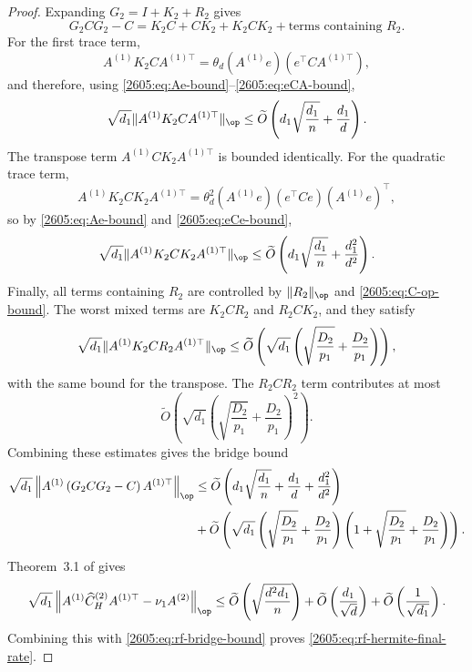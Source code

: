 \begin{proof}
Expanding $G_2=I+K_2+R_2$ gives
\[
    G_2CG_2-C
    =
    K_2C+CK_2+K_2CK_2
    +
    \text{terms containing }R_2.
\]
For the first trace term,
\[
    A^{(1)}K_2CA^{(1)\top}
    =
    \theta_d
    (A^{(1)}e)(e^\top C A^{(1)\top}),
\]
and therefore, using
\eqref{2605:eq:Ae-bound}--\eqref{2605:eq:eCA-bound},
\[
    \sqrt{d_1}
    \|A^{(1)}K_2CA^{(1)\top}\|_{\op}
    \le
    \widetilde O \left(
        d_1\sqrt{\frac{d_1}{n}}
        +
        \frac{d_1}{d}
    \right).
\]
The transpose term $A^{(1)}CK_2A^{(1)\top}$ is bounded identically. For
the quadratic trace term,
\[
    A^{(1)}K_2CK_2A^{(1)\top}
    =
    \theta_d^2
    (A^{(1)}e)(e^\top C e)(A^{(1)}e)^\top,
\]
so by \eqref{2605:eq:Ae-bound} and \eqref{2605:eq:eCe-bound},
\[
    \sqrt{d_1}
    \|A^{(1)}K_2CK_2A^{(1)\top}\|_{\op}
    \le
    \widetilde O \left(
        d_1\sqrt{\frac{d_1}{n}}
        +
        \frac{d_1^2}{d^2}
    \right).
\]
Finally, all terms containing $R_2$ are controlled by
$\|R_2\|_{\op}$ and
\eqref{2605:eq:C-op-bound}. The worst mixed terms are $K_2CR_2$ and
$R_2CK_2$, and they satisfy
\[
    \sqrt{d_1}
    \|A^{(1)}K_2CR_2A^{(1)\top}\|_{\op}
    \le
    \widetilde O \left(
        \sqrt{d_1}\left(
        \sqrt{\frac{D_2}{p_1}}
        +
        \frac{D_2}{p_1}
    \right)
    \right),
\]
with the same bound for the transpose. The $R_2CR_2$ term contributes at
most
\[
    \widetilde O \left(
        \sqrt{d_1}\left(
        \sqrt{\frac{D_2}{p_1}}
        +
        \frac{D_2}{p_1}
    \right)^2
    \right).
\]
Combining these estimates gives the bridge bound
\begin{align}
\sqrt{d_1}
\left\|
    A^{(1)}
    \left(
        G_2CG_2-C
    \right)
    A^{(1)\top}
\right\|_{\op}&
\le
\widetilde O \left(
    d_1\sqrt{\frac{d_1}{n}}
    +
    \frac{d_1}{d}
    +
    \frac{d_1^2}{d^2}
\right) \nonumber\\
& + \widetilde O \left( \sqrt{d_1}\left(\sqrt{\frac{D_2}{p_1}}
        +
        \frac{D_2}{p_1}
    \right)\left(1+\sqrt{\frac{D_2}{p_1}}
        +
        \frac{D_2}{p_1}\right)
        \right).
\label{2605:eq:rf-bridge-bound}
\end{align}
Theorem~3.1 of \cite{tabanelli2026deep} gives
\[
\sqrt{d_1}
\left\|
    A^{(1)}\widehat C_H^{(2)}A^{(1)\top}
    -
    \nu_1A^{(2)}
\right\|_{\op}
\le
\widetilde O \left(
    \sqrt{\frac{d^2d_1}{n}}
\right)
+
\widetilde O \left(
    \frac{d_1}{\sqrt d}
\right)
+
\widetilde O \left(
    \frac1{\sqrt{d_1}}
\right).
\]
Combining this with \eqref{2605:eq:rf-bridge-bound} proves
\eqref{2605:eq:rf-hermite-final-rate}.
\end{proof}

